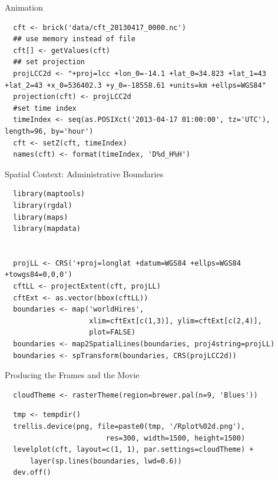 \documentclass[xcolor={usenames,svgnames,dvipsnames}]{beamer}
\begin{document}
\begin{frame}[fragile,label=sec-4-14]{Animation}
 \lstset{language=R,label= ,caption= ,numbers=none}
\begin{lstlisting}
  cft <- brick('data/cft_20130417_0000.nc')
  ## use memory instead of file
  cft[] <- getValues(cft)
  ## set projection
  projLCC2d <- "+proj=lcc +lon_0=-14.1 +lat_0=34.823 +lat_1=43 +lat_2=43 +x_0=536402.3 +y_0=-18558.61 +units=km +ellps=WGS84"
  projection(cft) <- projLCC2d
  #set time index
  timeIndex <- seq(as.POSIXct('2013-04-17 01:00:00', tz='UTC'), length=96, by='hour')
  cft <- setZ(cft, timeIndex)
  names(cft) <- format(timeIndex, 'D%d_H%H')
\end{lstlisting}
\end{frame}


\begin{frame}[fragile,label=sec-4-15]{Spatial Context: Administrative Boundaries}
 \lstset{language=R,label= ,caption= ,numbers=none}
\begin{lstlisting}
  library(maptools)
  library(rgdal)
  library(maps)
  library(mapdata)
  
  
  projLL <- CRS('+proj=longlat +datum=WGS84 +ellps=WGS84 +towgs84=0,0,0')
  cftLL <- projectExtent(cft, projLL)
  cftExt <- as.vector(bbox(cftLL))
  boundaries <- map('worldHires',
                    xlim=cftExt[c(1,3)], ylim=cftExt[c(2,4)],
                    plot=FALSE)
  boundaries <- map2SpatialLines(boundaries, proj4string=projLL)
  boundaries <- spTransform(boundaries, CRS(projLCC2d))
\end{lstlisting}
\end{frame}


\begin{frame}[fragile,label=sec-4-16]{Producing the Frames and the Movie}
 \lstset{language=R,label= ,caption= ,numbers=none}
\begin{lstlisting}
  cloudTheme <- rasterTheme(region=brewer.pal(n=9, 'Blues'))
\end{lstlisting}

\lstset{language=R,label= ,caption= ,numbers=none}
\begin{lstlisting}
  tmp <- tempdir()
  trellis.device(png, file=paste0(tmp, '/Rplot%02d.png'),
                        res=300, width=1500, height=1500)
  levelplot(cft, layout=c(1, 1), par.settings=cloudTheme) +
      layer(sp.lines(boundaries, lwd=0.6))
  dev.off()
\end{lstlisting}
\end{frame}
\end{document}
